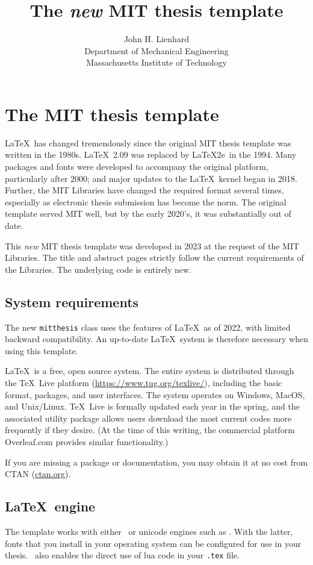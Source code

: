 \documentclass[11pt]{article}
\title{The \textit{new} MIT thesis template}
\author{John H. Lienhard \\ Department of Mechanical Engineering \\ Massachusetts Institute of Technology}
\date{\daymonthyeardate}
\newcommand*\pdfTeX{\hologo{pdfTeX}}
\begin{document}
\maketitle

\section*{The MIT thesis template}

\LaTeX\ has changed tremendously since the original MIT thesis template was written in the 1980s. \LaTeX\ 2.09 was replaced by \LaTeX2e\ in the 1994. Many packages and fonts were developed to accompany the original platform, particularly after 2000; and major updates to the \LaTeX\ kernel began in 2018.   Further, the MIT Libraries have changed the required format several times, especially as electronic thesis submission has become the norm. The original template served MIT well, but by the early 2020's, it was substantially out of date.  

This \textit{new} MIT thesis template was developed in 2023 at the request of the MIT Libraries.  The title and abstract pages strictly follow the current requirements of the Libraries. The underlying code is entirely new.


\subsection*{System requirements}
The new \texttt{mitthesis} class uses the features of \LaTeX\ as of 2022, with limited backward compatibility. An up-to-date \LaTeX\ system is therefore necessary when using this template.  

\LaTeX\ is a free, open source system. The entire system is distributed through the \TeX\ Live platform (\url{https://www.tug.org/texlive/}), including the basic format, packages, and user interfaces.  The system operates on Windows, MacOS, and Unix/Linux. \TeX\ Live is formally updated each year in the spring, and the associated utility package allows users download the most current codes more frequently if they desire. (At the time of this writing, the commercial platform Overleaf.com provides similar functionality.)

If you are missing a package or documentation, you may obtain it at no cost from CTAN (\href{http://ctan.org}{ctan.org}). 


\subsection*{\LaTeX\ engine}
The template works with either \pdfTeX\ or unicode engines such as \LuaLaTeX.  With the latter, fonts that you install in your operating system can be configured for use in your thesis. \LuaLaTeX\ also enables the direct use of lua code in your \texttt{.tex} file.
\end{document}
